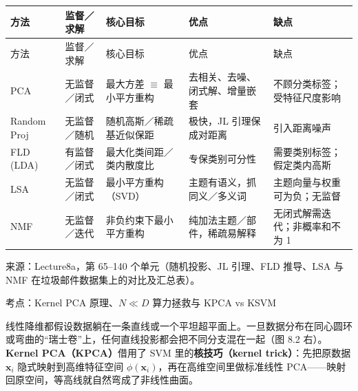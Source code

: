 \begingroup\small\setlength{\tabcolsep}{3pt}\renewcommand{\arraystretch}{1.22}
\begin{longtable}{@{}>{\raggedright\arraybackslash}p{}>{\raggedright\arraybackslash}p{}>{\raggedright\arraybackslash}p{}>{\raggedright\arraybackslash}p{}>{\raggedright\arraybackslash}p{}@{}}
\toprule
方法 & 监督／求解 & 核心目标 & 优点 & 缺点 \\
\midrule\endfirsthead
方法 & 监督／求解 & 核心目标 & 优点 & 缺点 \\
\midrule\endhead
\bottomrule\endfoot
PCA & 无监督／闭式 & 最大方差 $\equiv$ 最小平方重构 & 去相关、去噪、闭式解、增量嵌套 & 不顾分类标签；受特征尺度影响 \\
Random Proj & 无监督／随机 & 随机高斯／稀疏基近似保距 & 极快，JL 引理保成对距离 & 引入距离噪声 \\
FLD (LDA) & 有监督／闭式 & 最大化类间距／类内散度比 & 专保类别可分性 & 需要类别标签；假定类内高斯 \\
LSA & 无监督／闭式 & 最小平方重构（SVD） & 主题有语义，抓同义／多义词 & 主题向量与权重可为负；无监督 \\
NMF & 无监督／迭代 & 非负约束下最小平方重构 & 纯加法主题／部件，稀疏易解释 & 无闭式解需迭代；非概率和不为 1 \\
\end{longtable}\endgroup

来源：Lecture8a，第 65–140 个单元（随机投影、JL 引理、FLD 推导、LSA 与 NMF 在垃圾邮件数据集上的对比及汇总表）。



考点：Kernel PCA 原理、$N\ll D$ 算力拯救与 KPCA vs KSVM 

线性降维都假设数据躺在一条直线或一个平坦超平面上。一旦数据分布在同心圆环或弯曲的“瑞士卷”上，任何直线投影都会把不同分支混在一起（图 8.2 右）。\textbf{Kernel PCA（KPCA）}借用了 SVM 里的\textbf{核技巧（kernel trick）}：先把原数据 $\mathbf{x}_i$ 隐式映射到高维特征空间 $\phi(\mathbf{x}_i)$，再在高维空间里做标准线性 PCA——映射回原空间，等高线就自然弯成了非线性曲面。

